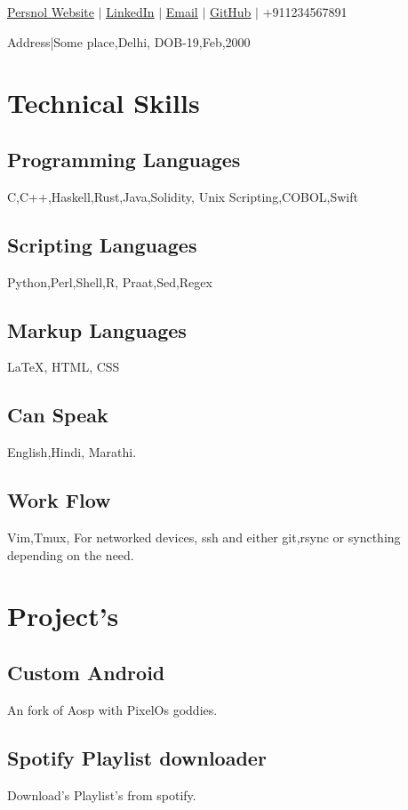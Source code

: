 \documentclass{article}
\makeatletter
\renewcommand{\maketitle}{

\begin{center}
	{\huge\bfseries
	\theauthor}
\vspace{.5em}


	\href{https://abhishrijoshi.com}{\underline{Persnol Website}} $|$ \href{https://in.linkedin.com/in/abhishri-joshi }{\underline {LinkedIn}} $|$ \href{mailto:abhishri@abhishrijoshi.com}{\underline {Email}} $|$ \href{https://github.com/abhishrijoshi}{\underline{GitHub}} $|$ +911234567891

\hfill \break
Address|Some place,Delhi,
DOB-19,Feb,2000


\end{center}
}
\makeatother
\begin{document}
\author{Abhishri Joshi}

\maketitle

\section{Technical Skills}


\subsection{Programming Languages }

C,C++,Haskell,Rust,Java,Solidity, Unix Scripting,COBOL,Swift

\subsection{Scripting Languages }
Python,Perl,Shell,R, Praat,Sed,Regex

\subsection{Markup Languages }
{\LaTeX}, HTML, CSS

\subsection{Can Speak}
English,Hindi, Marathi.

\subsection{Work Flow}
Vim,Tmux, For networked devices, ssh and either git,rsync or syncthing depending on the need.

\section{Project's}
\subsection{Custom Android}
An fork of Aosp with PixelOs goddies.

\subsection{Spotify Playlist downloader}
Download's Playlist's from spotify.
\end{document}
